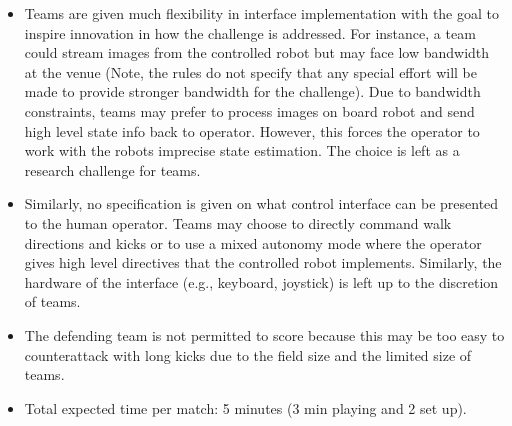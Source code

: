 \begin{itemize}
\item Teams are given much flexibility in interface implementation with the goal to inspire innovation in how the challenge is addressed. For instance, a team could stream images from the controlled robot but may face low bandwidth at the venue  (Note, the rules do not specify that any special effort will be made to provide stronger bandwidth for the challenge). Due to bandwidth constraints, teams may prefer to process images on board robot and send high level state info back to operator. However, this forces the operator to work with the robots imprecise state estimation. The choice is left as a research challenge for teams.
\item Similarly, no specification is given on what control interface can be presented to the human operator. Teams may choose to directly command walk directions and kicks or to use a mixed autonomy mode where the operator gives high level directives that the controlled robot implements. Similarly, the hardware of the interface (e.g., keyboard, joystick) is left up to the discretion of teams.
\item The defending team is not permitted to score because this may be too easy to counterattack with long kicks due to the field size and the limited size of teams.
\item Total expected time per match: 5 minutes (3 min playing and 2 set up). 
\end{itemize}

